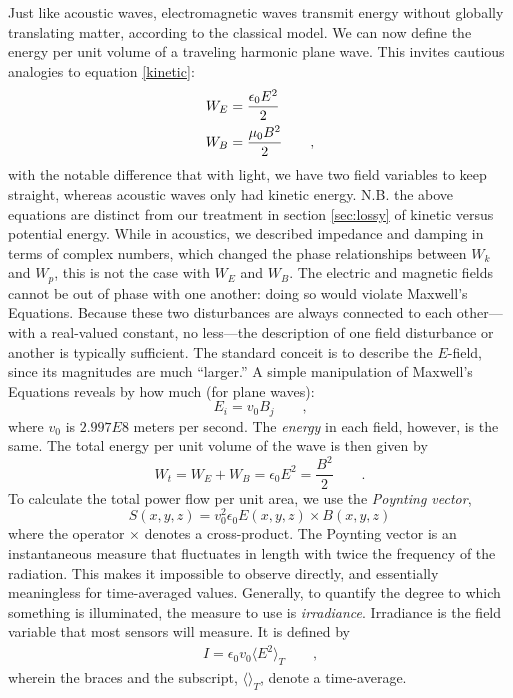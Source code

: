 \documentclass[a4paper,10pt]{report}
\numberwithin{equation}{section}
\begin{document}
Just like acoustic waves, electromagnetic waves transmit energy without globally translating matter, according to the classical model. We can now define the energy per unit volume of a traveling harmonic plane wave. This invites cautious analogies to equation \eqref{kinetic}:
\begin{align}\label{em_energy}
W_E &= \frac{\epsilon_0 E^2}{2}\notag\\
W_B &= \frac{\mu_0 B^2}{2}\qquad \text{,}
\end{align}
with the notable difference that with light, we have two field variables to keep straight, whereas acoustic waves only had kinetic energy. N.B. the above equations are distinct from our treatment in section \ref{sec:lossy} of kinetic versus potential energy. While in acoustics, we described impedance and damping in terms of complex numbers, which changed the phase relationships between $W_k$ and $W_p$, this is not the case with $W_E$ and $W_B$. The electric and magnetic fields cannot be out of phase with one another: doing so would violate Maxwell's Equations. \cite[p.~46]{Hecht1987} Because these two disturbances are always connected to each other---with a real-valued constant, no less---the description of one field disturbance or another is typically sufficient. The standard conceit is to describe the $E$-field, since its magnitudes are much ``larger.'' A simple manipulation of Maxwell's Equations reveals by how much  (for plane waves): \cite[p.~45]{Hecht1987}
\begin{equation}\label{EvB}
E_i = v_0 B_j \qquad \text{,}
\end{equation}
where $v_0$ is $2.997E8$ meters per second. The \emph{energy} in each field, however, is the same. The total energy per unit volume of the wave is then given by \cite[p.~46]{Hecht1987} 
\begin{equation}\label{emEtotal}
W_t = W_E + W_B = \epsilon_0 E^2 = \frac{B^2}{2} \qquad \text{.}
\end{equation}
To calculate the total power flow per unit area, we use the \emph{Poynting vector}, 
\begin{equation}\label{poynting}
S(x,y,z) = v_0^2 \epsilon_0 E(x,y,z) \times B(x,y,z)
\end{equation}
where the operator $\times$ denotes a cross-product. \cite[p.~46]{Hecht1987} The Poynting vector is an instantaneous measure that fluctuates in length with twice the frequency of the radiation. This makes it impossible to observe directly, and essentially meaningless for time-averaged values. Generally, to quantify the degree to which something is illuminated, the measure to use is \emph{irradiance}. Irradiance is the field variable that most sensors will measure. It is defined by
\begin{align}\label{irradiance}
I = \epsilon_0 v_0 \langle E^2 \rangle_T \qquad \text{,}
\end{align}
wherein the braces and the subscript, $\langle \rangle_T$, denote a time-average. \cite[p.~48]{Hecht1987}
\end{document}
